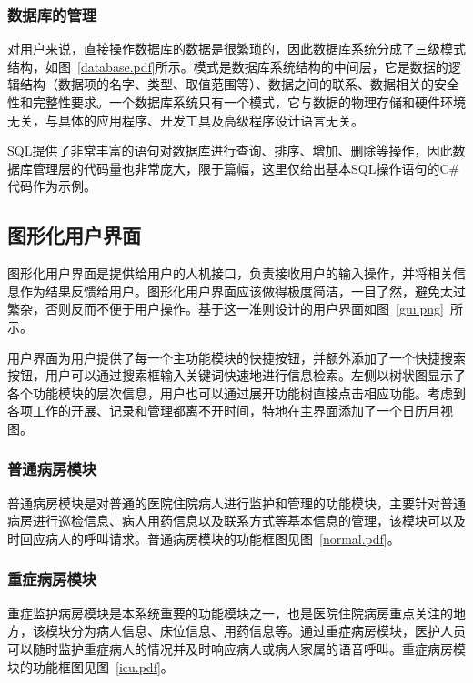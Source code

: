 \subsubsection{数据库的管理}
对用户来说，直接操作数据库的数据是很繁琐的，因此数据库系统分成了三级模式结构，如图~\ref{database.pdf}所示。模式是数据库系统结构的中间层，它是数据的逻辑结构（数据项的名字、类型、取值范围等）、数据之间的联系、数据相关的安全性和完整性要求。一个数据库系统只有一个模式，它与数据的物理存储和硬件环境无关，与具体的应用程序、开发工具及高级程序设计语言无关。

SQL提供了非常丰富的语句对数据库进行查询、排序、增加、删除等操作，因此数据库管理层的代码量也非常庞大，限于篇幅，这里仅给出基本SQL操作语句的C{\#}代码作为示例。\\


\subsection{图形化用户界面}
图形化用户界面是提供给用户的人机接口，负责接收用户的输入操作，并将相关信息作为结果反馈给用户。图形化用户界面应该做得极度简洁，一目了然，避免太过繁杂，否则反而不便于用户操作。基于这一准则设计的用户界面如图~\ref{gui.png}~所示。

用户界面为用户提供了每一个主功能模块的快捷按钮，并额外添加了一个快捷搜索按钮，用户可以通过搜索框输入关键词快速地进行信息检索。左侧以树状图显示了各个功能模块的层次信息，用户也可以通过展开功能树直接点击相应功能。考虑到各项工作的开展、记录和管理都离不开时间，特地在主界面添加了一个日历月视图。

\subsubsection{普通病房模块}
普通病房模块是对普通的医院住院病人进行监护和管理的功能模块，主要针对普通病房进行巡检信息、病人用药信息以及联系方式等基本信息的管理，该模块可以及时回应病人的呼叫请求。普通病房模块的功能框图见图~\ref{normal.pdf}。

\subsubsection{重症病房模块}
重症监护病房模块是本系统重要的功能模块之一，也是医院住院病房重点关注的地方，该模块分为病人信息、床位信息、用药信息等。通过重症病房模块，医护人员可以随时监护重症病人的情况并及时响应病人或病人家属的语音呼叫。重症病房模块的功能框图见图~\ref{icu.pdf}。

